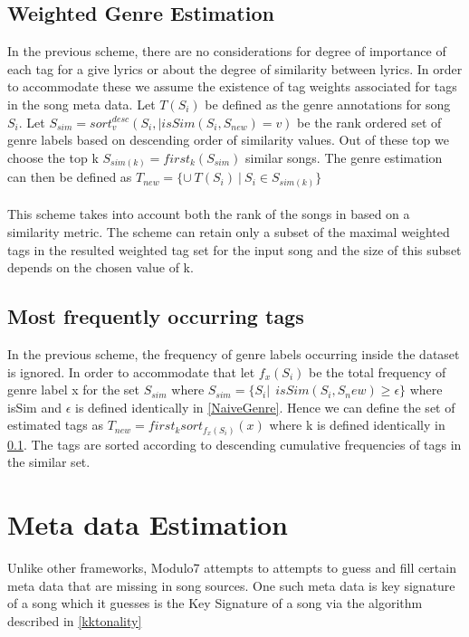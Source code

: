 \subsection{Weighted Genre Estimation} \label{WeightedGenre}

\noindent In the previous scheme, there are no considerations for degree of importance of each tag for a give lyrics or about the degree of similarity between lyrics. In order to accommodate these we assume the existence of tag weights associated for tags in the song meta data. Let $T(S_i)$ be defined as the genre annotations for song $S_i$. Let $S_{sim} = sort_v^{desc}({S_i, | isSim(S_i, S_{new}) = v})$ be the rank ordered set of genre labels based on descending order of similarity values. Out of these top we choose the top k $S_{sim(k)} = first_{k} (S_{sim})$ similar songs. The genre estimation can then be defined as $T_{new} = \{\cup \ T(S_i) \ | \ S_i \in S_{sim(k)}\}$ \\\\
This scheme takes into account both the rank of the songs in based on a similarity metric. The scheme can retain only a subset of the maximal weighted tags in the resulted weighted tag set for the input song and the size of this subset depends on the chosen value of k. 

\subsection{Most frequently occurring tags} \label{MaxFrequencyGenre}

\noindent In the previous scheme, the frequency of genre labels occurring inside the dataset is ignored. In order to accommodate that let $f_x(S_i)$ be the total frequency of genre label x for the set $S_{sim}$ where $S_{sim} = \{S_i | \ \ isSim(S_i, S_new) \geq \epsilon\}$ where isSim and $\epsilon$ is defined identically in \ref{NaiveGenre}.  Hence we can define the set of estimated tags as $T_{new} = first_{k} sort_{f_x(S_i)}(x)$ where k is defined identically in \ref{WeightedGenre}. The tags are sorted according to descending cumulative frequencies of tags in the similar set. 

\section{Meta data Estimation} \label{metadataestimation}

\noindent Unlike other frameworks, Modulo7 attempts to attempts to guess and fill certain meta data that are missing in song sources. One such meta data is key signature of a song which it guesses is the Key Signature of a song via the algorithm described in \ref{kktonality} 

